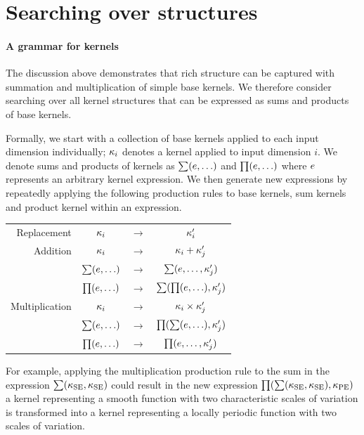 \documentclass[twoside]{article}
\begin{document}
\section{Searching over structures}

\paragraph{A grammar for kernels}

The discussion above demonstrates that rich structure can be captured with summation and multiplication of simple base kernels.
We therefore consider searching over all kernel structures that can be expressed as sums and products of base kernels.

Formally, we start with a collection of base kernels applied to each input dimension individually; $\kappa_i$ denotes a kernel applied to input dimension $i$.
We denote sums and products of kernels as $\sum(e,\ldots)$ and $\prod(e,\ldots)$ where $e$ represents an arbitrary kernel expression.
We then generate new expressions by repeatedly applying the following production rules to base kernels, sum kernels and product kernel within an expression.
\begin{center}
\begin{tabular}{rccc}
\textrm{Replacement} & $\kappa_i$ & $\to$ & $\kappa'_i$\\%
\textrm{Addition} & $\kappa_i$ & $\to$ & $\kappa_i + \kappa'_j$\\%
& $\sum(e,\ldots)$ & $\to$ & $\sum(e,\ldots,\kappa'_j)$\\%
& $\prod(e,\ldots)$ & $\to$ & $\sum(\prod(e,\ldots),\kappa'_j)$\\%
\textrm{Multiplication} & $\kappa_i$ &  $\to$ & $\kappa_i \times \kappa'_j$\\%
& $\sum(e,\ldots)$ & $\to$ & $\prod(\sum(e,\ldots),\kappa'_j)$\\%
& $\prod(e,\ldots)$ & $\to$ & $\prod(e,\ldots,\kappa'_j)$\\%
\end{tabular}
\end{center}
For example, applying the multiplication production rule to the sum in the expression $\sum(\kappa_\textrm{SE},\kappa_\textrm{SE})$ could result in the new expression $\prod(\sum(\kappa_\textrm{SE},\kappa_\textrm{SE}),\kappa_\textrm{PE})$ \ie a kernel representing a smooth function with two characteristic scales of variation is transformed into a kernel representing a locally periodic function with two scales of variation.
\end{document}

